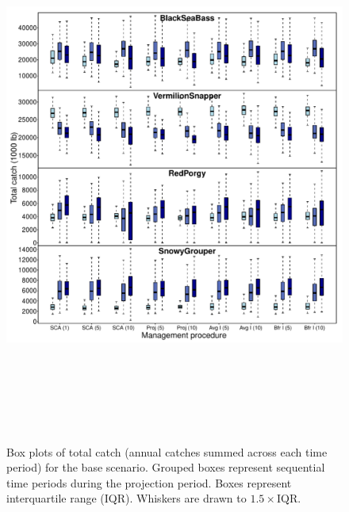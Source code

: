 \documentclass[12pt,english]{article}
\begin{document}
\clearpage\begin{figure}[!ht]
\begin{center}
\includegraphics[width=6in, height=7in]{../Figs/boxplotCatchTotal1.pdf}
\end{center}
\begin{flushleft}
\caption{Box plots of total catch (annual catches summed across each time period) for the base scenario. Grouped boxes represent sequential time periods during the projection period. Boxes represent interquartile range (IQR). Whiskers are drawn to $1.5\times\mathrm{IQR}$.}
\label{fig:boxplotCatchTotal1}
\end{flushleft}
\end{figure}
\end{document}
